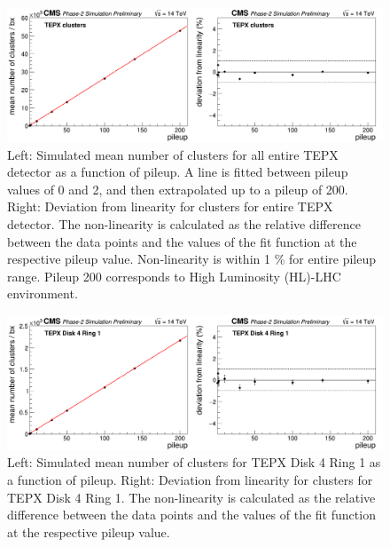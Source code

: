 \begin{figure}[H]
  \centering
  \includegraphics[width=1\columnwidth]{ashish_thesis/totalclusters.png}
  \caption{\onehalfspacing Left: Simulated mean number of clusters for all entire TEPX detector as a function of pileup. A line is fitted between pileup values of 0 and 2, and then extrapolated up to a pileup of 200. Right: Deviation from linearity for clusters for entire TEPX detector. The non-linearity is calculated as the relative difference between the data points and the values of the fit function at the respective pileup value. Non-linearity is within 1 \% for entire pileup range. Pileup 200 corresponds to High Luminosity (HL)-LHC environment.}
  \label{fig:CMS}
\end{figure}



\begin{figure}[H]
  \centering
  \includegraphics[width=1\columnwidth]{ashish_thesis/clustersD4R1.png}
  \caption{\onehalfspacing Left: Simulated mean number of clusters for TEPX Disk 4 Ring 1 as a function of pileup. Right: Deviation from linearity for clusters for TEPX Disk 4 Ring 1. The non-linearity is calculated as the relative difference between the data points and the values of the fit function at the respective pileup value.}
  \label{fig:CMS}
\end{figure}



